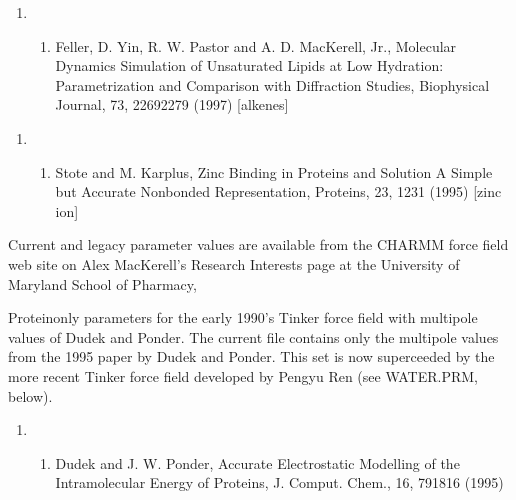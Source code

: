 \documentclass[letterpaper,11pt,english]{sphinxmanual}
\begin{document}
\begin{enumerate}
%
\setcounter{enumi}{18}
\item {} \begin{enumerate}
%
\setcounter{enumii}{4}
\item {} 
Feller, D. Yin, R. W. Pastor and A. D. MacKerell, Jr., Molecular Dynamics Simulation of Unsaturated Lipids at Low Hydration: Parametrization and Comparison with Diffraction Studies, Biophysical Journal, 73, 2269\sphinxhyphen{}2279 (1997)  {[}alkenes{]}

\end{enumerate}

\end{enumerate}
\begin{enumerate}
%
\setcounter{enumi}{17}
\item {} \begin{enumerate}
%
\setcounter{enumii}{7}
\item {} 
Stote and M. Karplus, Zinc Binding in Proteins and Solution \sphinxhyphen{} A Simple but Accurate Nonbonded Representation, Proteins, 23, 12\sphinxhyphen{}31 (1995)  {[}zinc ion{]}

\end{enumerate}

\end{enumerate}

Current and legacy parameter values are available from the CHARMM force field web site on Alex MacKerell’s  Research Interests page at the University of Maryland School of Pharmacy, 


Protein\sphinxhyphen{}only parameters for the early 1990’s Tinker force field with multipole values of Dudek and Ponder. The current file contains only the multipole values from the 1995 paper by Dudek and Ponder. This set is now superceeded by the more recent Tinker force field developed by Pengyu Ren (see WATER.PRM, below).
\begin{enumerate}
%
\setcounter{enumi}{12}
\item {} \begin{enumerate}
%
\setcounter{enumii}{9}
\item {} 
Dudek and J. W. Ponder, Accurate Electrostatic Modelling of the Intramolecular Energy of Proteins, J. Comput. Chem., 16, 791\sphinxhyphen{}816 (1995)

\end{enumerate}

\end{enumerate}
\end{document}
